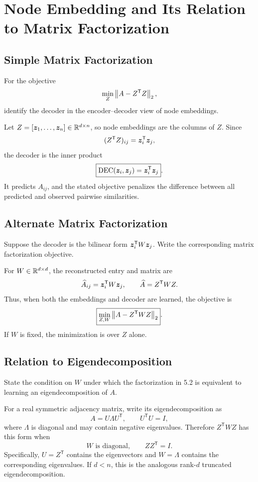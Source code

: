 \clearpage
\section{Node Embedding and Its Relation to Matrix Factorization}

\subsection{Simple Matrix Factorization}

For the objective
\[
  \min_Z \left\lVert A-Z^{\mathsf T}Z \right\rVert_2,
\]
identify the decoder in the encoder--decoder view of node embeddings.

\begin{solution}
Let \(Z=[\bm{z}_1,\ldots,\bm{z}_n]\in\mathbb{R}^{d\times n}\), so node embeddings
are the columns of \(Z\).  Since
\[
  (Z^{\mathsf T}Z)_{ij}=\bm{z}_i^{\mathsf T}\bm{z}_j,
\]
the decoder is the inner product
\[
  \boxed{\operatorname{DEC}(\bm{z}_i,\bm{z}_j)
  =\bm{z}_i^{\mathsf T}\bm{z}_j}.
\]
It predicts \(A_{ij}\), and the stated objective penalizes the difference
between all predicted and observed pairwise similarities.
\end{solution}

\subsection{Alternate Matrix Factorization}

Suppose the decoder is the bilinear form
$\bm{z}_i^{\mathsf T}W\bm{z}_j$. Write the corresponding matrix
factorization objective.

\begin{solution}
For \(W\in\mathbb{R}^{d\times d}\), the reconstructed entry and matrix are
\[
  \widehat A_{ij}=\bm{z}_i^{\mathsf T}W\bm{z}_j,
  \qquad
  \widehat A=Z^{\mathsf T}WZ.
\]
Thus, when both the embeddings and decoder are learned, the objective is
\[
  \boxed{\min_{Z,W}\left\lVert A-Z^{\mathsf T}WZ \right\rVert_2}.
\]
If \(W\) is fixed, the minimization is over \(Z\) alone.
\end{solution}

\subsection{Relation to Eigendecomposition}

State the condition on $W$ under which the factorization in 5.2 is equivalent
to learning an eigendecomposition of $A$.

\begin{solution}
For a real symmetric adjacency matrix, write its eigendecomposition as
\[
  A=U\Lambda U^{\mathsf T},
  \qquad U^{\mathsf T}U=I,
\]
where \(\Lambda\) is diagonal and may contain negative eigenvalues.  Therefore
\(Z^{\mathsf T}WZ\) has this form when
\[
  \boxed{W\text{ is diagonal},\qquad ZZ^{\mathsf T}=I}.
\]
Specifically, \(U=Z^{\mathsf T}\) contains the eigenvectors and
\(W=\Lambda\) contains the corresponding eigenvalues.  If \(d<n\), this is
the analogous rank-\(d\) truncated eigendecomposition.
\end{solution}

